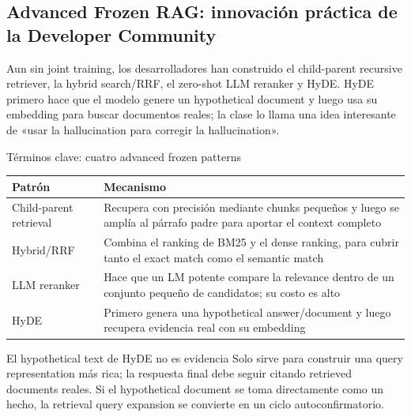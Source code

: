 \subsection{Advanced Frozen RAG: innovación práctica de la Developer Community}

Aun sin joint training, los desarrolladores han construido el child-parent recursive retriever, la hybrid search/RRF, el zero-shot LLM reranker y HyDE. HyDE primero hace que el modelo genere un hypothetical document y luego usa su embedding para buscar documentos reales; la clase lo llama una idea interesante de «usar la hallucination para corregir la hallucination».


\begin{knowledgebox}{Términos clave: cuatro advanced frozen patterns}
\begin{tabularx}{\textwidth}{L{0.25\textwidth}>{\raggedright\arraybackslash}X}
\toprule
Patrón & Mecanismo \\
\midrule
Child-parent retrieval & Recupera con precisión mediante chunks pequeños y luego se amplía al párrafo padre para aportar el context completo \\
Hybrid/RRF & Combina el ranking de BM25 y el dense ranking, para cubrir tanto el exact match como el semantic match \\
LLM reranker & Hace que un LM potente compare la relevance dentro de un conjunto pequeño de candidatos; su costo es alto \\
HyDE & Primero genera una hypothetical answer/document y luego recupera evidencia real con su embedding \\
\bottomrule
\end{tabularx}
\end{knowledgebox}

\begin{warningbox}{El hypothetical text de HyDE no es evidencia}
Solo sirve para construir una query representation más rica; la respuesta final debe seguir citando retrieved documents reales. Si el hypothetical document se toma directamente como un hecho, la retrieval query expansion se convierte en un ciclo autoconfirmatorio.
\end{warningbox}


